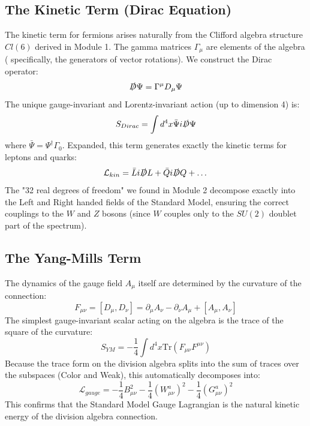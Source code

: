 \subsection{The Kinetic Term (Dirac Equation)}
The kinetic term for fermions arises naturally from the Clifford algebra structure $Cl(6)$ derived in Module 1. The gamma matrices $\Gamma_\mu$ are elements of the algebra ( specifically, the generators of vector rotations).
We construct the Dirac operator:
\begin{equation}
    \slashed{D} \Psi = \Gamma^\mu D_\mu \Psi
\end{equation}
The unique gauge-invariant and Lorentz-invariant action (up to dimension 4) is:
\begin{equation}
    S_{Dirac} = \int d^4x \bar{\Psi} i \slashed{D} \Psi
\end{equation}
where $\bar{\Psi} = \Psi^\dagger \Gamma_0$.
Expanded, this term generates exactly the kinetic terms for leptons and quarks:
\begin{equation}
    \mathcal{L}_{kin} = \bar{L} i \slashed{D} L + \bar{Q} i \slashed{D} Q + \dots
\end{equation}
The "32 real degrees of freedom" we found in Module 2 decompose exactly into the Left and Right handed fields of the Standard Model, ensuring the correct couplings to the $W$ and $Z$ bosons (since $W$ couples only to the $SU(2)$ doublet part of the spectrum).

\subsection{The Yang-Mills Term}
The dynamics of the gauge field $A_\mu$ itself are determined by the curvature of the connection:
\begin{equation}
    F_{\mu\nu} = [D_\mu, D_\nu] = \partial_\mu A_\nu - \partial_\nu A_\mu + [A_\mu, A_\nu]
\end{equation}
The simplest gauge-invariant scalar acting on the algebra is the trace of the square of the curvature:
\begin{equation}
    S_{YM} = -\frac{1}{4} \int d^4x \text{Tr}(F_{\mu\nu} F^{\mu\nu})
\end{equation}
Because the trace form on the division algebra splits into the sum of traces over the subspaces (Color and Weak), this automatically decomposes into:
\begin{equation}
    \mathcal{L}_{gauge} = -\frac{1}{4} B_{\mu\nu}^2 - \frac{1}{4} (W_{\mu\nu}^a)^2 - \frac{1}{4} (G_{\mu\nu}^a)^2
\end{equation}
This confirms that the Standard Model Gauge Lagrangian is the natural kinetic energy of the division algebra connection.

